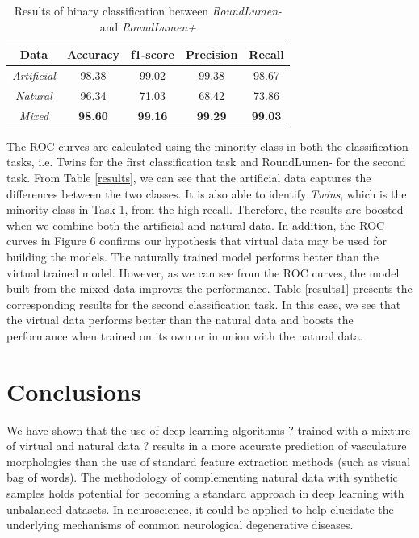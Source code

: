 \begin{table}[H]
\label{table:results1}
\centering
\caption{Results of binary classification between \textit{RoundLumen-} and \textit{RoundLumen+}}
\begin{tabular}{ | c | c | c | c | c |} 
\hline
Data & Accuracy & f1-score & Precision & Recall \\ 
\hline
\textit{Artificial} & 98.38 & 99.02 & 99.38 & 98.67 \\ 
\hline
\textit{Natural} & 96.34& 71.03& 68.42& 73.86 \\
\hline
\textit{Mixed} & \textbf{98.60} &  \textbf{99.16} & \textbf{99.29} & \textbf{99.03} \\
\hline
\end{tabular}
\end{table}

The ROC curves are calculated using the minority class in both the classification tasks, i.e. Twins for the first classification task and RoundLumen- for the second task.
From Table \ref{results}, we can see that the artificial data captures the differences between the two classes. It is also able to identify \textit{Twins}, which is the minority class in Task 1, from the high recall. Therefore, the results are boosted when we combine both the artificial and natural data. In addition, the ROC curves in Figure 6 confirms our hypothesis that virtual data may be used for building the models. The naturally trained model performs better than the virtual trained model. However, as we can see from the ROC curves, the model built from the mixed data improves the performance. Table \ref{results1} presents the corresponding results for the second classification task. In this case, we see that the virtual data performs better than the natural data and boosts the performance when trained on its own or in union with the natural data.

\section{Conclusions}
We have shown that the use of deep learning algorithms ?  trained with a mixture of virtual and natural data ?  results in a more accurate prediction of vasculature morphologies than the use of standard feature extraction methods (such as visual bag of words). The methodology of complementing natural data with synthetic samples holds potential for becoming a standard approach in deep learning with unbalanced datasets. In neuroscience, it could be applied to help elucidate the underlying mechanisms of common neurological degenerative diseases.